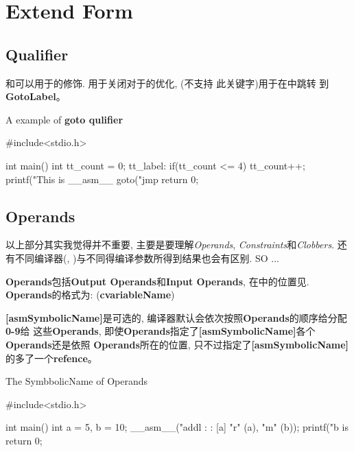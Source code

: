 
\section{Extend Form}

\subsection{Qualifier}
和可以用于\inlineasm 的修饰.
用于关闭\gcc 对于\inlineasm 的优化, (\llvmclang 不支持%
此关键字)用于在\inlineasm 中跳转%
到{\bf GotoLabel}。

\begin{codelst}[H]
\caption{A example of {\bf goto qulifier}}
\label{lst:empofgoto}
\begin{clangcode}
#include<stdio.h>

int main()
{
    int tt_count = 0;
    tt_label:
    if(tt_count <= 4){
        tt_count++;
        printf("This is %
        __asm__ goto("jmp %
    }
    return 0;
}
\end{clangcode}
\end{codelst}

\subsection{Operands}

以上部分其实我觉得并不重要, \inlineasm 主要是要理解{\em Operands}, {\em Constraints}和{\em Clobbers}.%
还有不同编译器(\gcc, \llvmclang)与不同得编译参数所得到结果也会有区别. SO ...\par
\bigskip

{\bf Operands}包括{\bf Output  Operands}和{\bf Input Operands}, %
在\inlineasm 中的位置见. {\bf Operands}的格式为:\newline
{} ({\bf cvariableName})\par

{\bf [asmSymbolicName]}是可选的, 编译器默认会依次按照{\bf Operands}的顺序给分配{\bf 0-9}给%
这些{\bf Operands}, 即使{\bf Operands}指定了{\bf [asmSymbolicName]}各个{\bf Operands}还是依照%
{\bf Operands}所在的位置, 只不过指定了{\bf [asmSymbolicName]}的多了一个{\bf refence}。

\begin{codelst}[H]
\caption{The SymbbolicName of Operands}
\label{lst:symname}
\begin{clangcode}
#include<stdio.h>

int main()
{
    int a = 5, b = 10;
    __asm__("addl %
            :
            : [a] "r" (a), "m" (b));
    printf("b is %
    return 0;
}
\end{clangcode}
\end{codelst}


